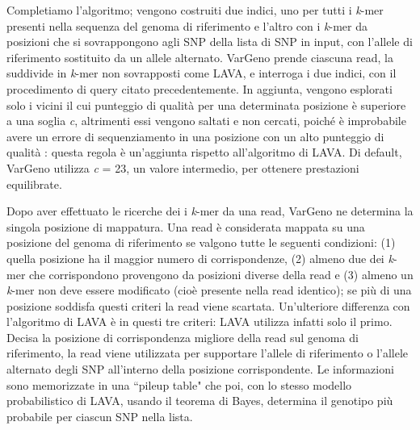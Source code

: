 \documentclass[../main.tex]{subfiles}
\begin{document}
\noindent
Completiamo l'algoritmo; vengono costruiti due indici, uno per tutti i \textit{k}-mer presenti nella sequenza del genoma di riferimento e l'altro con i \textit{k}-mer da posizioni che si sovrappongono agli SNP della lista di SNP in input, con l'allele di riferimento sostituito da un allele alternato. VarGeno prende ciascuna read, la suddivide in \textit{k}-mer non sovrapposti come LAVA, e interroga i due indici, con il procedimento di query citato precedentemente. In aggiunta, vengono esplorati solo i vicini il cui punteggio di qualità per una determinata posizione è superiore a una soglia \textit{c}, altrimenti essi vengono saltati e non cercati, poiché è improbabile avere un errore di sequenziamento in una posizione con un alto punteggio di qualità \cite{sun-medvedev2018vargeno}: questa regola è un'aggiunta rispetto all'algoritmo di LAVA. Di default, VarGeno utilizza \textit{c} = 23, un valore intermedio, per ottenere prestazioni equilibrate. 

Dopo aver effettuato le ricerche dei i \textit{k}-mer da una read, VarGeno ne determina la singola posizione di mappatura. Una read è considerata mappata su una posizione del genoma di riferimento se valgono tutte le seguenti condizioni: (1) quella posizione ha il maggior numero di corrispondenze, (2) almeno due dei \textit{k}-mer che corrispondono provengono da posizioni diverse della read e (3) almeno un \textit{k}-mer non deve essere modificato (cioè presente nella read identico); se più di una posizione soddisfa questi criteri la read viene scartata. Un'ulteriore differenza con l'algoritmo di LAVA è in questi tre criteri: LAVA utilizza infatti solo il primo. Decisa la posizione di corrispondenza migliore della read sul genoma di riferimento, la read viene utilizzata per supportare l'allele di riferimento o l'allele alternato degli SNP all'interno della posizione corrispondente. Le informazioni sono memorizzate in una ``pileup table" che poi, con lo stesso modello probabilistico di LAVA, usando il teorema di Bayes, determina il genotipo più probabile per ciascun SNP nella lista.
\end{document}
